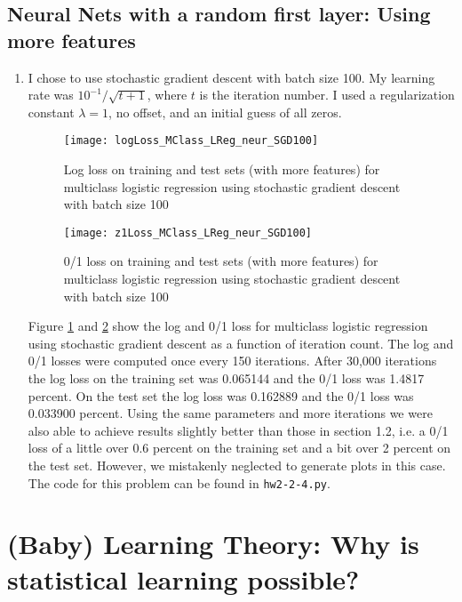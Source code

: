 \documentclass{article}
\begin{document}
\subsection{Neural Nets with a random first layer: Using more features}
\begin{enumerate}
	\item I chose to use stochastic gradient descent with batch size 100. My learning rate was $10^{-1}/\sqrt{t+1}$, where $t$ is the iteration number. I used a regularization constant $\lambda=1$, no offset, and an initial guess of all zeros.

	\begin{figure}
        \centering
        \texttt{[image: logLoss\_MClass\_LReg\_neur\_SGD100]}
        \caption{Log loss on training and test sets (with more features) for multiclass logistic regression using stochastic gradient descent with batch size 100} 
        \label{fig:2.4log}
    \end{figure}
    \begin{figure}
        \centering
        \texttt{[image: z1Loss\_MClass\_LReg\_neur\_SGD100]}
        \caption{0/1 loss on training and test sets (with more features) for multiclass logistic regression using stochastic gradient descent with batch size 100} 
        \label{fig:2.4z1}
    \end{figure}


	Figure \ref{fig:2.4log} and \ref{fig:2.4z1} show the log and 0/1 loss for multiclass logistic regression using stochastic gradient descent as a function of iteration count. The log and 0/1 losses were computed once every 150 iterations. 
	After 30,000 iterations the log loss on the training set was 0.065144 and the 0/1 loss was 1.4817 percent. On the test set the log loss was 0.162889 and the 0/1 loss was 0.033900 percent. Using the same parameters and more iterations we were also able to achieve results slightly better than those in section 1.2, i.e. a 0/1 loss of a little over 0.6 percent on the training set and a bit over 2 percent on the test set. However, we mistakenly neglected to generate plots in this case. The code for this problem can be found in \texttt{hw2-2-4.py}.
\end{enumerate}


\section{(Baby) Learning Theory: Why is statistical learning possible?}
\end{document}

